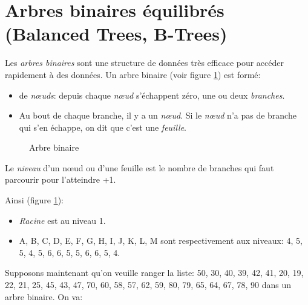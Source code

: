 \section{Arbres binaires équilibrés (Balanced Trees, B-Trees)}
Les \emph{arbres binaires} sont une structure de données très efficace
pour accéder rapidement à des données. Un arbre binaire (voir figure
\ref{bt1})  est formé:
\begin{itemize}
\item de \emph{n{\oe}uds}: depuis chaque \emph{n{\oe}ud} s'échappent zéro,
  une ou deux \emph{branches}.
\item Au bout de chaque branche, il y a un \emph{n{\oe}ud}. Si le
  \emph{n{\oe}ud} n'a pas de branche qui s'en échappe, on dit que
  c'est une \emph{feuille}.
\end{itemize}

\begin{figure}
\caption{Arbre binaire}\label{bt1}
\end{figure}

 Le \emph{niveau} d'un n{\oe}ud ou d'une feuille est le nombre de branches
 qui faut parcourir pour l'atteindre +1.

 Ainsi (figure \ref{bt1}):
 \begin{itemize}
 \item \emph{Racine} est au niveau 1.
 \item A, B, C, D, E, F, G,  H, I, J, K, L, M sont respectivement aux niveaux:
   4, 5, 5, 4, 5, 6, 6,  5, 5, 6, 6, 5, 4.
 \end{itemize}
   
Supposons maintenant qu'on veuille ranger la liste:  50, 30, 40, 39,
42, 41, 20, 19, 22, 21, 25, 45, 43, 47, 70, 60, 58, 57, 62, 59, 80,
79, 65, 64, 67, 78, 90 dans un arbre binaire. On va:

